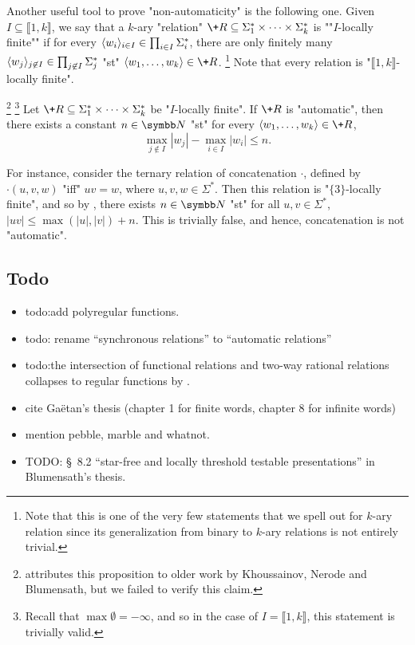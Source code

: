 Another useful tool to prove "non-automaticity" is the following one.
Given $I \subseteq \lBrack 1,k\rBrack$,
we say that a $k$-ary "relation" $\+R \subseteq \Sigma_1^* \times \cdots \times \Sigma_k^*$ is
""$I$-locally finite"" if for every $\langle w_i\rangle_{i\in I} \in \prod_{i\in I} \Sigma_i^*$,
there are only finitely many $\langle w_j\rangle_{j\not\in I} \in \prod_{j \not\in I} \Sigma_j^*$
"st" $\tup{w_1,\hdots,w_k} \in \+R$.%
\footnote{Note that this is one of the very few statements
that we spell out for $k$-ary relation since its generalization from binary to $k$-ary relations
is not entirely trivial.}
Note that every relation is "$\lBrack 1,k\rBrack$-locally finite".
\begin{proposition}
	\!\footnote{\cite{KhoussainovNiesRubinStephan2007Automatic} attributes this proposition
	to older work by Khoussainov, Nerode and Blumensath, but we failed to verify this claim.}
	\footnote{Recall that $\max{\emptyset} = -\infty$, and so in the case
	of $I = \lBrack 1,k\rBrack$, this statement is trivially valid.}
	\AP\label{prop:bound-automatic-structures}
	Let $\+R \subseteq \Sigma_1^* \times \cdots \times \Sigma_k^*$ be "$I$-locally finite".
	If $\+R$ is "automatic", then there exists a constant $n\in\N$ "st" for every
	$\tup{w_1,\hdots,w_k} \in \+R$,
	\[
		\max_{j \not\in I}{|w_j|} - \max_{i \in I}{|w_i|} \leq n.
	\]
\end{proposition}

For instance, consider the ternary relation of concatenation $\cdot$,
defined by $\cdot(u,v,w)$ "iff" $uv = w$, where $u,v,w\in\Sigma^*$.
Then this relation is "$\{3\}$-locally finite", and so by
, there exists $n\in \N$
"st" for all $u,v \in \Sigma^*$, $|uv| \leq \max{(|u|,|v|)} + n$.
This is trivially false, and hence, concatenation is not "automatic".

\subsection{Todo}

\begin{itemize}
	\item todo:add polyregular functions.
	\item todo: rename ``synchronous relations'' to ``automatic relations''
	\item todo:the intersection of
	functional relations and two-way rational relations
	collapses to regular functions by
	\cite[Theorem 22, p.~243]{EH2001transduction}.
	\item cite Gaëtan's thesis (chapter 1 for finite words, chapter 8 for infinite words)
	\item mention pebble, marble and whatnot.
	\item TODO: \S~8.2 ``star-free and locally threshold testable presentations''
		in Blumensath's thesis.
\end{itemize}
